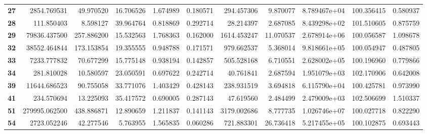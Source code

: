 \begin{table}[h]
\begin{tabular}{lrrrrrrrrrr}
\textbf{27} &    2854.769531 &       49.970520 &                  16.706526 &  1.674989 &  0.180571 &   294.457306 &   9.870077 &  8.789467e+04 &  100.356415 &     0.580937 \\
\textbf{28} &     111.850403 &        8.598127 &                  39.964764 &  0.818869 &  0.292714 &    28.214397 &   2.687085 &  8.439298e+02 &  101.510605 &     0.875759 \\
\textbf{29} &   79836.437500 &      257.886200 &                  15.532563 &  1.768363 &  0.162000 &  1614.453247 &  11.070537 &  2.678914e+06 &  100.056587 &     1.098678 \\
\textbf{32} &   38552.464844 &      173.153854 &                  19.355555 &  0.948788 &  0.171571 &   979.662537 &   5.368014 &  9.818661e+05 &  100.054947 &     0.487805 \\
\textbf{33} &    7233.777832 &       70.677299 &                  15.775148 &  0.938194 &  0.142857 &   505.528168 &   6.710551 &  2.628002e+05 &  100.196960 &     0.779866 \\
\textbf{34} &     281.810028 &       10.580597 &                  23.050591 &  0.697622 &  0.242714 &    40.761841 &   2.687594 &  1.951079e+03 &  102.170906 &     0.642008 \\
\textbf{39} &   11644.686523 &       90.755058 &                  33.771076 &  1.403429 &  0.428143 &   238.931519 &   3.694818 &  6.115790e+04 &  100.425781 &     0.973990 \\
\textbf{41} &     234.570694 &       13.225093 &                  35.417572 &  0.690005 &  0.287143 &    47.619560 &   2.484499 &  2.479009e+03 &  102.506699 &     1.510337 \\
\textbf{51} &  279995.062500 &      438.886871 &                  12.890659 &  1.211837 &  0.141143 &  3179.002686 &   8.777735 &  1.026746e+07 &  100.027718 &     0.822290 \\
\textbf{54} &    2723.052246 &       42.277546 &                   5.763955 &  1.565835 &  0.060286 &   721.883301 &  26.736418 &  5.217455e+05 &  100.102875 &     0.693443 \\
\bottomrule
\end{tabular}
\end{table}
